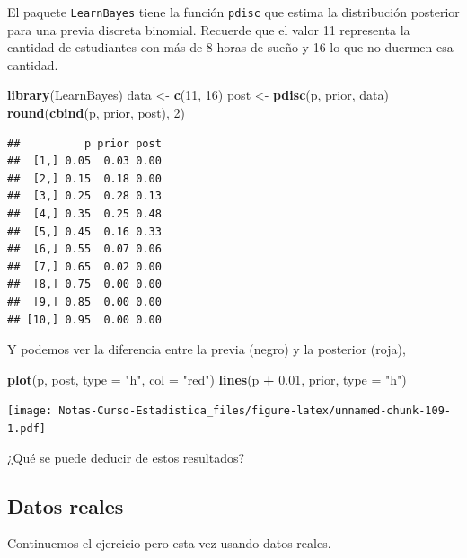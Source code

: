 \documentclass[
  12pt,
]{book}
\newenvironment{Shaded}{\begin{snugshade}}{\end{snugshade}}
\newcommand{\DataTypeTok}[1]{\textcolor[rgb]{0.13,0.29,0.53}{#1}}
\newcommand{\DecValTok}[1]{\textcolor[rgb]{0.00,0.00,0.81}{#1}}
\newcommand{\FloatTok}[1]{\textcolor[rgb]{0.00,0.00,0.81}{#1}}
\newcommand{\KeywordTok}[1]{\textcolor[rgb]{0.13,0.29,0.53}{\textbf{#1}}}
\newcommand{\NormalTok}[1]{#1}
\newcommand{\OperatorTok}[1]{\textcolor[rgb]{0.81,0.36,0.00}{\textbf{#1}}}
\newcommand{\StringTok}[1]{\textcolor[rgb]{0.31,0.60,0.02}{#1}}
\theoremstyle{definition}
\theoremstyle{definition}
\theoremstyle{definition}
\theoremstyle{remark}
\begin{document}
El paquete \texttt{LearnBayes} tiene la función \texttt{pdisc} que estima la
distribución posterior para una previa discreta binomial. Recuerde que
el valor 11 representa la cantidad de estudiantes con más de 8 horas
de sueño y 16 lo que no duermen esa cantidad.

\begin{Shaded}
\begin{Highlighting}[]
\KeywordTok{library}\NormalTok{(LearnBayes)}
\NormalTok{data <-}\StringTok{ }\KeywordTok{c}\NormalTok{(}\DecValTok{11}\NormalTok{, }\DecValTok{16}\NormalTok{)}
\NormalTok{post <-}\StringTok{ }\KeywordTok{pdisc}\NormalTok{(p, prior, data)}
\KeywordTok{round}\NormalTok{(}\KeywordTok{cbind}\NormalTok{(p, prior, post), }\DecValTok{2}\NormalTok{)}
\end{Highlighting}
\end{Shaded}

\begin{verbatim}
##          p prior post
##  [1,] 0.05  0.03 0.00
##  [2,] 0.15  0.18 0.00
##  [3,] 0.25  0.28 0.13
##  [4,] 0.35  0.25 0.48
##  [5,] 0.45  0.16 0.33
##  [6,] 0.55  0.07 0.06
##  [7,] 0.65  0.02 0.00
##  [8,] 0.75  0.00 0.00
##  [9,] 0.85  0.00 0.00
## [10,] 0.95  0.00 0.00
\end{verbatim}

Y podemos ver la diferencia entre la previa (negro) y la posterior
(roja),

\begin{Shaded}
\begin{Highlighting}[]
\KeywordTok{plot}\NormalTok{(p, post, }\DataTypeTok{type =} \StringTok{"h"}\NormalTok{, }\DataTypeTok{col =} \StringTok{"red"}\NormalTok{)}
\KeywordTok{lines}\NormalTok{(p }\OperatorTok{+}\StringTok{ }\FloatTok{0.01}\NormalTok{, prior, }\DataTypeTok{type =} \StringTok{"h"}\NormalTok{)}
\end{Highlighting}
\end{Shaded}

\texttt{[image: Notas-Curso-Estadistica\_files/figure-latex/unnamed-chunk-109-1.pdf]}

¿Qué se puede deducir de estos resultados?

\hypertarget{datos-reales}{%
\subsection{Datos reales}\label{datos-reales}}

Continuemos el ejercicio pero esta vez usando datos reales.
\end{document}
